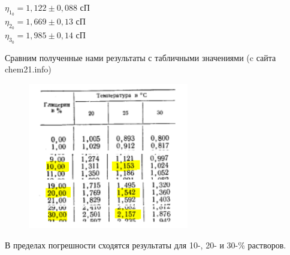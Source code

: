 \documentclass[a4paper]{article}
\begin{document}
\begin{enumerate}
    \begin{center}
    $\eta_1_0 = 1,122 \pm 0,088$ сП\\
    $\eta_2_0 = 1,669 \pm 0,13$ сП\\
    $\eta_3_0 = 1,985 \pm 0,14$ сП\\
    \end{center}
    
    Сравним полученные нами результаты с табличными значениями (c сайта chem21.info)
    
    \begin{figure}[h]
    \centering
    \includegraphics[width=70mm]{table.png}
    \label{fig:vac}
    \end{figure}
    
    В пределах погрешности сходятся результаты для 10-, 20- и 30-\% растворов.

\end{enumerate}
\end{document}
